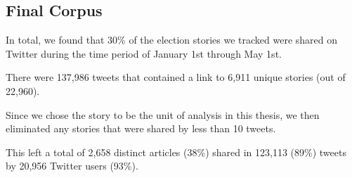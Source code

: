 \subsection{Final Corpus}

In total, we found that 30\% of the election stories we tracked were shared on Twitter during the time period of January 1st through May 1st.

There were 137,986 tweets that contained a link to 6,911 unique stories (out of 22,960).

Since we chose the story to be the unit of analysis in this thesis, we then eliminated any stories that were shared by less than 10 tweets.

This left a total of 2,658 distinct articles (38\%) shared in 123,113 (89\%) tweets by 20,956 Twitter users (93\%).

  
